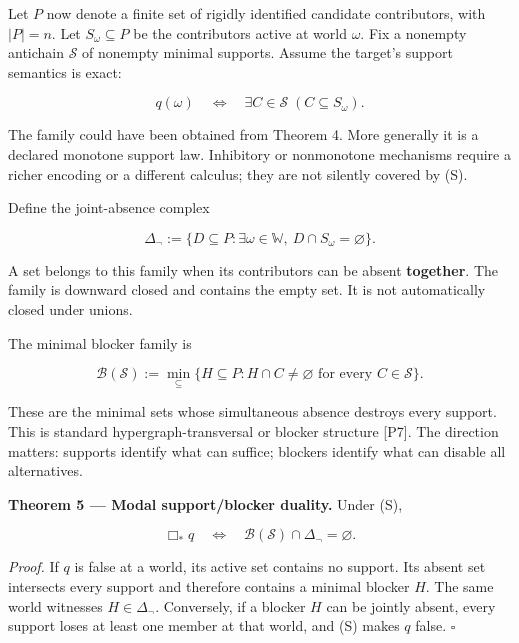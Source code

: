 \documentclass[11pt,a4paper]{article}
\begin{document}
Let \(P\) now denote a finite set of rigidly identified candidate
contributors, with \(|P|=n\). Let \(S_\omega\subseteq P\) be the
contributors active at world \(\omega\). Fix a nonempty antichain
\(\mathscr S\) of nonempty minimal supports. Assume the target's support
semantics is exact:

\nopagebreak[4]

\[
q(\omega)
\quad\Longleftrightarrow\quad
\exists C\in\mathscr S\;(C\subseteq S_\omega).
\tag{S}
\]

The family could have been obtained from Theorem 4. More generally it is
a declared monotone support law. Inhibitory or nonmonotone mechanisms
require a richer encoding or a different calculus; they are not silently
covered by (S).

Define the joint-absence complex

\nopagebreak[4]

\[
\Delta_{\neg}
 :=\{D\subseteq P:\exists\omega\in\mathbb W,
                         \ D\cap S_\omega=\varnothing\}.
\]

A set belongs to this family when its contributors can be absent
\textbf{together}. The family is downward closed and contains the empty
set. It is not automatically closed under unions.

The minimal blocker family is

\nopagebreak[4]

\[
\mathscr B(\mathscr S)
 :=\min_{\subseteq}\{H\subseteq P:
                     H\cap C\ne\varnothing\text{ for every }C\in\mathscr S\}.
\]

These are the minimal sets whose simultaneous absence destroys every
support. This is standard hypergraph-transversal or blocker structure
{[}P7{]}. The direction matters: supports identify what can suffice;
blockers identify what can disable all alternatives.


\textbf{Theorem 5 --- Modal support/blocker duality.} Under (S),

\nopagebreak[4]

\[
\boxed{
\Box_*q
\quad\Longleftrightarrow\quad
\mathscr B(\mathscr S)\cap\Delta_{\neg}=\varnothing.
}
\]

\emph{Proof.} If \(q\) is false at a world, its active set contains no
support. Its absent set intersects every support and therefore contains
a minimal blocker \(H\). The same world witnesses \(H\in\Delta_{\neg}\).
Conversely, if a blocker \(H\) can be jointly absent, every support
loses at least one member at that world, and (S) makes \(q\) false.
\(\square\)
\end{document}
